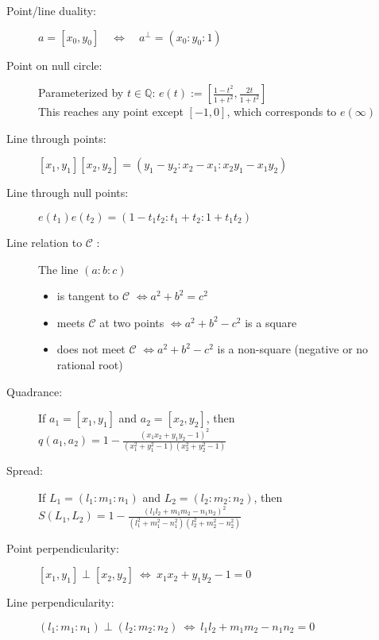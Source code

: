 \documentclass[DIV16,halfparskip]{scrartcl}
\newcommand{\nullcm}{\mathcal C}
\newcommand{\nullconic}{$\nullcm$ }
\begin{document}
\begin{description}
    \item [Point/line duality:] \(a=[x_0,y_0] \quad\Leftrightarrow\quad a^\perp=(x_0:y_0:1) \)

    \item [Point on null circle:] Parameterized by $t\in\mathbb{Q}$:
        \( e(t) := \left[\frac{1-t^2}{1+t^2}, \frac{2t}{1+t^2}\right] \)\\
        This reaches any point except $[-1,0]$, which corresponds to $e(\infty)$

    \item [Line through points:] \( [x_1,y_1] [x_2,y_2] =
         (y_1-y_2 : x_2-x_1 : x_2y_1-x_1y_2) \)

    \item [Line through null points:] \( e(t_1)e(t_2) = 
        (1-t_1t_2 : t_1+t_2 : 1+t_1t_2) \)

   \item [Line relation to \nullconic:] The line $(a:b:c)$
       \begin{itemize}
            \item is tangent to \nullconic $\Leftrightarrow a^2+b^2=c^2$ 
            \item meets \nullconic at two points $\Leftrightarrow a^2+b^2-c^2$
                is a square
            \item does not meet \nullconic $\Leftrightarrow a^2+b^2-c^2$
                is a non-square (negative or no rational root)
       \end{itemize}

    \item [Quadrance:] If $a_1=[x_1,y_1]$ and $a_2=[x_2,y_2]$, then
        \( q(a_1,a_2) = 1 - \frac{(x_1x_2 + y_1y_2 - 1)^2}{(x_1^2+y_1^2-1)(x_2^2+y_2^2-1)} \)

    \item [Spread:] If $L_1=(l_1:m_1:n_1)$ and $L_2=(l_2:m_2:n_2)$, then
        \( S(L_1,L_2) = 1 - \frac{(l_1l_2 + m_1m_2 - n_1n_2)^2}
                                 {(l_1^2+m_1^2-n_1^2)(l_2^2+m_2^2-n_2^2)} \)

    \item [Point perpendicularity:]
        \( [x_1,y_1]\perp[x_2,y_2] ~\Leftrightarrow~ x_1x_2 + y_1y_2 - 1 = 0 \)

    \item [Line perpendicularity:]
        \( (l_1:m_1:n_1)\perp(l_2:m_2:n_2) ~\Leftrightarrow~ l_1l_2 + m_1m_2 - n_1n_2 = 0 \)
\end{description}
\end{document}
